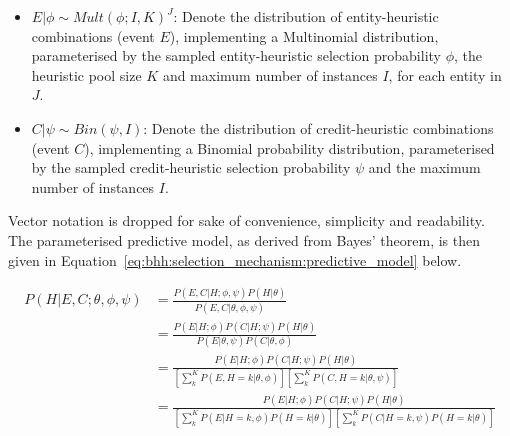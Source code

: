 \begin{itemize}
      \item $E \vert \phi \sim Mult(\phi; I, K)^{J}$: Denote the distribution of entity-heuristic combinations (event $E$), implementing a Multinomial distribution, parameterised by the sampled entity-heuristic selection probability $\phi$, the heuristic pool size $K$ and maximum number of instances $I$, for each entity in $J$.

      \item $C \vert \psi \sim Bin(\psi, I)$: Denote the distribution of credit-heuristic combinations (event $C$), implementing a Binomial probability distribution, parameterised by the sampled credit-heuristic selection probability $\psi$ and the maximum number of instances $I$.
\end{itemize}

Vector notation is dropped for sake of convenience, simplicity and readability. The parameterised predictive model, as derived from Bayes' theorem, is then given in Equation~\eqref{eq:bhh:selection_mechanism:predictive_model} below.

\begin{equation}
      \label{eq:bhh:selection_mechanism:predictive_model}
      \begin{split}
            P(H \vert E, C;  \theta, \phi, \psi)
            &= \frac{
                  P(E, C \vert H;  \phi, \psi)  P(H \vert \theta)
            }{
                  P(E, C \vert \theta, \phi, \psi)
            } \\
            &= \frac{
                  P(E \vert H;  \phi)  P(C \vert H;  \psi) P(H \vert \theta)
            }{
                  P(E \vert \theta, \psi) P(C \vert \theta, \phi)
            } \\
            &= \frac{
                  P(E \vert H;  \phi)  P(C \vert H;  \psi) P(H \vert \theta)
            }{
                  \left[ \sum_{k}^{K} P(E, H=k \vert \theta, \phi) \right] \left[ \sum_{k}^{K}  P(C, H=k \vert \theta, \psi) \right]
            } \\
            &= \frac{
                  P(E \vert H;  \phi)  P(C \vert H;  \psi) P(H \vert \theta)
            }{
                  \left[ \sum_{k}^{K} P(E \vert H=k, \phi) P(H=k \vert \theta) \right] \left[ \sum_{k}^{K} P(C \vert H=k, \psi) P(H=k \vert \theta) \right]
            }
      \end{split}
\end{equation}

